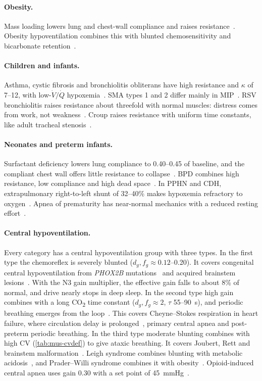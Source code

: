 \paragraph{Obesity.} Mass loading lowers lung and chest-wall compliance and raises resistance~\citep{pelosi1998a}. Obesity hypoventilation combines this with blunted chemosensitivity and bicarbonate retention~\citep{masa2019,piper2011}.

\paragraph{Children and infants.} Asthma, cystic fibrosis and bronchiolitis obliterans have high resistance and $\kappa$ of 7--12, with low-$\dot V/\dot Q$ hypoxemia~\citep{global2023,elborn2016}. SMA types 1 and 2 differ mainly in MIP~\citep{mercuri2018}. RSV bronchiolitis raises resistance about threefold with normal muscles: distress comes from work, not weakness~\citep{ralston2014}. Croup raises resistance with uniform time constants, like adult tracheal stenosis~\citep{bjornson2008}.

\paragraph{Neonates and preterm infants.} Surfactant deficiency lowers lung compliance to 0.40--0.45 of baseline, and the compliant chest wall offers little resistance to collapse~\citep{sweet2022}. BPD combines high resistance, low compliance and high dead space~\citep{jobe2001,jobe2011}. In PPHN and CDH, extrapulmonary right-to-left shunt of 32--40\% makes hypoxemia refractory to oxygen~\citep{steinhorn2010,deprest2009}. Apnea of prematurity has near-normal mechanics with a reduced resting effort~\citep{martin2011}.

\paragraph{Central hypoventilation.} Every category has a central hypoventilation group with three types. In the first type the chemoreflex is severely blunted ($d_g,f_g\approx0.12$--0.20). It covers congenital central hypoventilation from \emph{PHOX2B} mutations~\citep{weesemayer2010,trang2005} and acquired brainstem lesions~\citep{ondine1956}. With the N3 gain multiplier, the effective gain falls to about 8\% of normal, and drive nearly stops in deep sleep. In the second type high gain combines with a long CO\textsubscript{2} time constant ($d_g,f_g\approx2$, $\tau$ 55--\SI{90}{\second}), and periodic breathing emerges from the loop~\citep{khoo1982,dempsey2010}. This covers Cheyne--Stokes respiration in heart failure, where circulation delay is prolonged~\citep{bradley2003}, primary central apnea and post-preterm periodic breathing. In the third type moderate blunting combines with high CV (\cref{tab:mus-cvdef}) to give ataxic breathing. It covers Joubert, Rett and brainstem malformation~\citep{joubert1969,julu2001,sarnat2004}. Leigh syndrome combines blunting with metabolic acidosis~\citep{leigh1951}, and Prader--Willi syndrome combines it with obesity~\citep{gillett2016}. Opioid-induced central apnea uses gain 0.30 with a set point of \SI{45}{\mmHg}~\citep{pattinson2008}.

